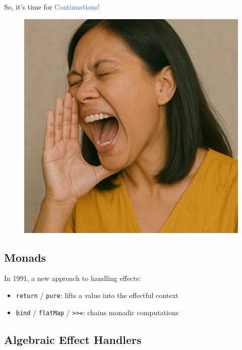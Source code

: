 \begin{frame}
\begin{minipage}[t]{.41\textwidth}
		\centering
		\large
		So, it's time
		for
		\LARGE
		\textcolor{highlight}{\boldslant Continuations!}
	\end{minipage}
	\begin{minipage}[t]{.30\textwidth}
		\begin{figure}[h]
			\centering
			\sloppy
			\includegraphics[height=.38\textheight]{img/woman-shouting.png}
		\end{figure}
	\end{minipage}
\end{frame}

\subsection{Monads}

\begin{frame}[fragile]
	\frametitlesubs{}

	In 1991, a new approach to handling effects\cite{moggi1991notions}:

	\begin{itemize}
		\item \verb|return| / \verb|pure|: lifts a value into the effectful context
		\item {\verb|bind| / \verb|flatMap| / \texttt{>>=}}: chains monadic computations
	\end{itemize}

\end{frame}

\subsection{Algebraic Effect Handlers}
\begin{frame}
	\frametitlesubs
\end{frame}
